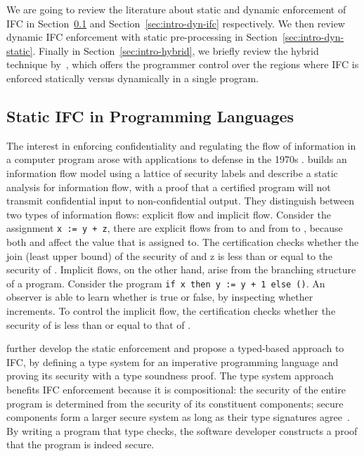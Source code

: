 We are going to review the literature about static and dynamic enforcement of
IFC in Section~\ref{sec:intro-static-ifc} and Section~\ref{sec:intro-dyn-ifc}
respectively. We then review dynamic IFC enforcement with static pre-processing
in Section~\ref{sec:intro-dyn-static}. Finally in
Section~\ref{sec:intro-hybrid}, we briefly review the hybrid technique
by~\textcite{Buiras:2015aa}, which offers the programmer control over the
regions where IFC is enforced statically versus dynamically in a single program.

\subsection{Static IFC in Programming Languages}
\label{sec:intro-static-ifc}

The interest in enforcing confidentiality and regulating the flow of information
in a computer program arose with applications to defense in the 1970s
\autocite{bell1976secure}. \textcite{denning1976lattice} builds an information
flow model using a lattice of security labels and
\textcite{denning1977certification} describe a static analysis for information
flow, with a proof that a certified program will not transmit confidential input
to non-confidential output. They distinguish between two types of information
flows: explicit flow and implicit flow. Consider the assignment \texttt{x := y +
  z}, there are explicit flows from  to  and from  to
, because both  and  affect the value that  is
assigned to. The certification checks whether the join (least upper bound) of
the security of  and {z} is less than or equal to the security of
. Implicit flows, on the other hand, arise from the branching structure
of a program. Consider the program \texttt{if x then y := y + 1 else ()}. An
observer is able to learn whether  is true or false, by inspecting
whether  increments. To control the implicit flow, the certification
checks whether the security of  is less than or equal to that of .

\textcite{volpano1996sound} further develop the static enforcement and propose a
typed-based approach to IFC, by defining a type system for an imperative
programming language and proving its security with a type soundness proof. The
type system approach benefits IFC enforcement because it is compositional: the
security of the entire program is determined from the security of its
constituent components; secure components form a larger secure system as long as
their type signatures agree~\cite{sabelfeld2003language}. By writing a program
that type checks, the software developer constructs a proof that the program is
indeed secure.

